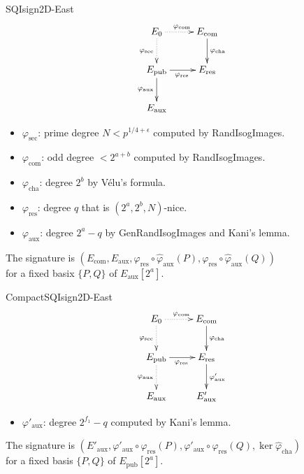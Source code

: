 \documentclass[12pt]{beamer}
\begin{document}
\begin{frame}[plain]{SQIsign2D-East}
    $$
        \xymatrix{
            E_0 \ar@{..>}[r]^{\varphi_\mathrm{com}} \ar@{..>}[d]_{\varphi_\mathrm{sec}} & E_\mathrm{com} \ar[d]^{\varphi_\mathrm{cha}} \\
            E_\mathrm{pub} \ar[r]_{\varphi_\mathrm{res}} \ar[d]_{\varphi_\mathrm{aux}} & E_\mathrm{res}\\
            E_\mathrm{aux} & 
        }
    $$

    \begin{itemize}
        \item $\varphi_\mathrm{sec}$: prime degree $N < p^{1/4 + \epsilon}$ computed by \textsf{RandIsogImages}.
        \item $\varphi_\mathrm{com}$: odd degree $< 2^{a+b}$ computed by \textsf{RandIsogImages}.
        \item $\varphi_\mathrm{cha}$: degree $2^b$ by V\'elu's formula.
        \item $\varphi_\mathrm{res}$: degree $q$ that is $(2^a, 2^b, N)$-nice.
        \item $\varphi_\mathrm{aux}$: degree $2^a - q$ by \textsf{GenRandIsogImages} and Kani's lemma.
    \end{itemize}

    \vspace*{5pt}
    The signature is
    $(E_\mathrm{com}, E_\mathrm{aux},
    \varphi_\mathrm{res}\circ\hat{\varphi}_\mathrm{aux}(P), \varphi_\mathrm{res}\circ\hat{\varphi}_\mathrm{aux}(Q))$\\[3pt]
    for a fixed basix $\{P, Q\}$ of $E_\mathrm{aux}[2^a]$.
\end{frame}

\begin{frame}{CompactSQIsign2D-East}
    $$
        \xymatrix{
            E_0 \ar@{..>}[r]^{\varphi_\mathrm{com}} \ar@{..>}[d]_{\varphi_\mathrm{sec}} & E_\mathrm{com} \ar[d]^{\varphi_\mathrm{cha}} \\
            E_\mathrm{pub} \ar[r]_{\varphi_\mathrm{res}} \ar@{..>}[d]_{\varphi_\mathrm{aux}} & E_\mathrm{res} \ar[d]^{\varphi'_\mathrm{aux}}\\
            E_\mathrm{aux} & E'_\mathrm{aux}
        }
    $$

    \begin{itemize}
        \item $\varphi'_\mathrm{aux}$: degree $2^{f_1} - q$ computed by Kani's lemma.
    \end{itemize}

    \vspace*{10pt}
    The signature is
    $(E'_\mathrm{aux}, \varphi'_\mathrm{aux}\circ\varphi_\mathrm{res}(P), \varphi'_\mathrm{aux}\circ\varphi_\mathrm{res}(Q), \ker\hat{\varphi}_\mathrm{cha})$\\[3pt]
    for a fixed basis $\{P, Q\}$ of $E_\mathrm{pub}[2^a]$.
\end{frame}
\end{document}
